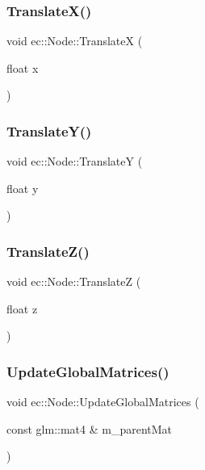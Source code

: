 \subsubsection{\texorpdfstring{Translate\+X()}{TranslateX()}}
{\footnotesize\ttfamily void ec\+::\+Node\+::\+TranslateX (\begin{DoxyParamCaption}\item[{float}]{x }\end{DoxyParamCaption})}

\mbox{\label{classec_1_1_node_a823a4ed88acaf530b29901bb8c50e920}} 
\subsubsection{\texorpdfstring{Translate\+Y()}{TranslateY()}}
{\footnotesize\ttfamily void ec\+::\+Node\+::\+TranslateY (\begin{DoxyParamCaption}\item[{float}]{y }\end{DoxyParamCaption})}

\mbox{\label{classec_1_1_node_a4f3622e18ba67afc383d69f31c073b8e}} 
\subsubsection{\texorpdfstring{Translate\+Z()}{TranslateZ()}}
{\footnotesize\ttfamily void ec\+::\+Node\+::\+TranslateZ (\begin{DoxyParamCaption}\item[{float}]{z }\end{DoxyParamCaption})}

\mbox{\label{classec_1_1_node_ac9970ec0ec03e130da59d0d5376a9855}} 
\subsubsection{\texorpdfstring{Update\+Global\+Matrices()}{UpdateGlobalMatrices()}}
{\footnotesize\ttfamily void ec\+::\+Node\+::\+Update\+Global\+Matrices (\begin{DoxyParamCaption}\item[{const glm\+::mat4 \&}]{m\+\_\+parent\+Mat }\end{DoxyParamCaption})}


